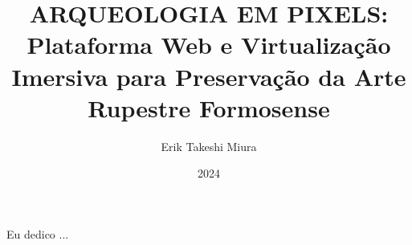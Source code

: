 \documentclass[pt,twoside,onehalfspacing,bsc]{ifgtcc}
\title{
ARQUEOLOGIA EM PIXELS:
Plataforma Web e Virtualização Imersiva para 
Preservação da Arte Rupestre Formosense 
}
\date{2024}
\author{Erik Takeshi Miura}
\begin{document}
\frontmatter
\frontpage
\presentationpage

\begin{fichacatalografica}
\FakeFichaCatalografica %
%
\end{fichacatalografica}

\begin{dedicatory}
Eu dedico ...
\end{dedicatory}



\resumo


\abstract


\tableofcontents

\listoffigures
\listoftables
\listofacronyms

\mainmatter






\begin{references}

\end{references}

\theappendix
\end{document}
